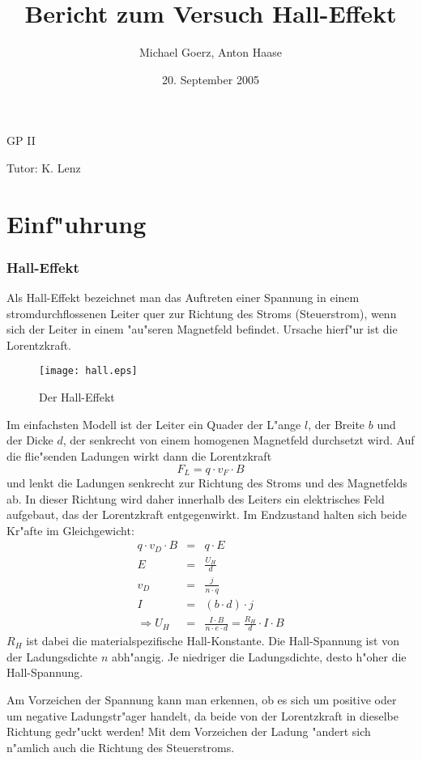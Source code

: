 \documentclass[a4paper,10pt]{article}
\title{Bericht zum Versuch Hall-Effekt}
\author{Michael Goerz, Anton Haase}
\date{20. September 2005}
\begin{document}
\maketitle
\noindent GP II

\noindent Tutor: K. Lenz

\section{Einf"uhrung}
\subsubsection*{Hall-Effekt}
Als Hall-Effekt bezeichnet man das Auftreten einer Spannung in einem stromdurchflossenen Leiter quer zur Richtung des Stroms (Steuerstrom), wenn sich der Leiter in einem "au"seren Magnetfeld befindet. Ursache hierf"ur ist die Lorentzkraft.

\begin{figure}[htbp]
    \centering
    \texttt{[image: hall.eps]}
    \caption{Der Hall-Effekt}
    \label{hall}
\end{figure}


Im einfachsten Modell ist der Leiter ein Quader der L"ange $l$, der Breite $b$ und der Dicke $d$, der senkrecht von einem homogenen Magnetfeld durchsetzt wird. Auf die flie"senden Ladungen wirkt dann die Lorentzkraft
\begin{equation}
F_L = q \cdot v_F \cdot B
\end{equation}
und lenkt die Ladungen senkrecht zur Richtung des Stroms und des Magnetfelds ab. In dieser Richtung wird daher innerhalb des Leiters ein elektrisches Feld aufgebaut, das der Lorentzkraft entgegenwirkt. Im Endzustand halten sich beide Kr"afte im Gleichgewicht:
\begin{eqnarray}
q \cdot v_D \cdot B &=& q \cdot E\\
E &=& \frac{U_H}{d}\\
v_D &=& \frac{j}{n \cdot q}\\
I &=& (b \cdot d) \cdot j\\
\Rightarrow U_H &=& \frac{I \cdot B}{n \cdot e \cdot d} = \frac{R_H}{d} \cdot I \cdot B
\end{eqnarray}
$R_H$ ist dabei die materialspezifische Hall-Konstante. Die Hall-Spannung ist von der Ladungsdichte $n$ abh"angig. Je niedriger die Ladungsdichte, desto h"oher die Hall-Spannung.

Am Vorzeichen der Spannung kann man erkennen, ob es sich um positive oder um negative Ladungstr"ager handelt, da beide von der Lorentzkraft in dieselbe Richtung gedr"uckt werden! Mit dem Vorzeichen der Ladung "andert sich n"amlich auch die Richtung des Steuerstroms.
\end{document}
